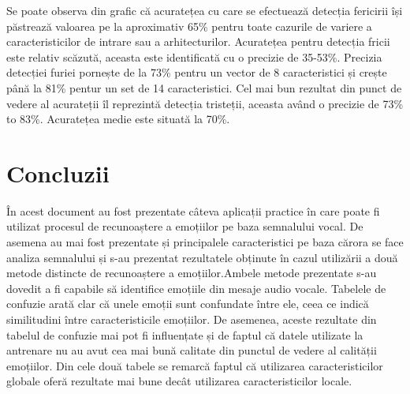 \documentclass[9pt,shortpaper,twoside,web]{ieeecolor}
\begin{document}
Se poate observa din grafic că acuratețea cu care se efectuează detecția fericirii își păstrează valoarea pe la aproximativ 65\% pentru toate cazurile de variere a caracteristicilor de intrare sau a arhitecturilor. Acuratețea pentru detecția fricii este relativ scăzută, aceasta este identificată cu o precizie de 35-53\%. Precizia detecției furiei pornește de la 73\% pentru un vector de 8 caracteristici și crește până la 81\% pentur un set de 14 caracteristici. Cel mai bun rezultat din punct de vedere al acurateții îl reprezintă detecția tristeții, aceasta având o precizie de 73\% to 83\%. Acuratețea medie este situată la 70\%. 


\section{Concluzii}
În acest document au fost prezentate câteva aplicații practice în care poate fi utilizat procesul de recunoaștere a emoțiilor pe baza semnalului vocal. De asemena au mai fost prezentate și principalele caracteristici pe baza cărora se face analiza semnalului și s-au prezentat rezultatele obținute în cazul utilizării a două metode distincte de recunoaștere a emoțiilor.Ambele metode prezentate s-au dovedit a fi capabile să identifice emoțiile din mesaje audio vocale. Tabelele de confuzie arată clar că unele emoții sunt confundate între ele, ceea ce indică similitudini între caracteristicile emoțiilor. De asemenea, aceste rezultate din tabelul de confuzie mai pot fi influențate și de faptul că datele utilizate la antrenare nu au avut cea mai bună calitate din punctul de vedere al calității emoțiilor. Din cele două tabele se remarcă faptul că utilizarea caracteristicilor globale oferă rezultate mai bune decât utilizarea caracteristicilor locale. 
\end{document}
